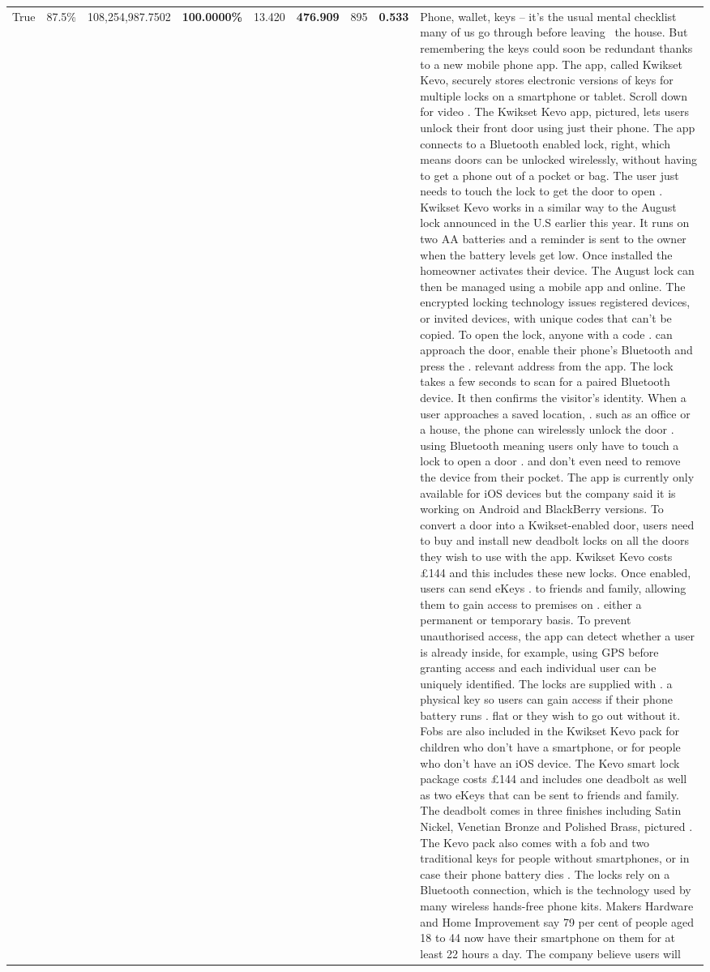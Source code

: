 \begin{table}[H]
\begin{tabular}{lllrlllll}
True & 87.5\% & 108,254,987.7502 & \bfseries \color{red} 100.0000\% & 13.420 & \bfseries \color{red} 476.909 & 895 & \bfseries \color{red} 0.533 & Phone, wallet, keys – it’s the usual mental checklist many of us go through before leaving  the house. But remembering the keys could soon be redundant thanks to a new mobile phone app. The app, called Kwikset Kevo, securely stores electronic versions of keys for multiple locks on a smartphone or tablet. Scroll down for video . The Kwikset Kevo app, pictured, lets users unlock their front door using just their phone. The app connects to a Bluetooth enabled lock, right, which means doors can be unlocked wirelessly, without having to get a phone out of a pocket or bag. The user just needs to touch the lock to get the door to open . Kwikset Kevo works in a similar way to the August lock announced in the U.S earlier this year. It runs on two AA batteries and a reminder is sent to the owner when the battery levels get low. Once installed the homeowner activates their device. The August lock can then be managed using a mobile app and online. The encrypted locking technology issues registered devices, or invited devices, with unique codes that can't be copied. To open the lock, anyone with a code . can approach the door, enable their phone's Bluetooth and press the . relevant address from the app. The lock takes a few seconds to scan for a paired Bluetooth device. It then confirms the visitor's identity. When a user approaches a saved location, . such as an office or a house, the phone can wirelessly unlock the door . using Bluetooth meaning users only have to touch a lock to open a door . and don't even need to remove the device from their pocket. The app is currently only available for iOS devices but the company said it is working on Android and BlackBerry versions. To convert a door into a Kwikset-enabled door, users need to buy and install new deadbolt locks on all the doors they wish to use with the app. Kwikset Kevo costs £144 and this includes these new locks. Once enabled, users can send eKeys . to friends and family, allowing them to gain access to premises on . either a permanent or temporary basis. To prevent unauthorised access, the app can detect whether a user is already inside, for example, using GPS before granting access and each individual user can be uniquely identified. The locks are supplied with . a physical key so users can gain access if their phone battery runs . flat or they wish to go out without it. Fobs are also included in the Kwikset Kevo pack for children who don't have a smartphone, or for people who don't have an iOS device. The Kevo smart lock package costs £144 and includes one deadbolt as well as two eKeys that can be sent to friends and family. The deadbolt comes in three finishes including Satin Nickel, Venetian Bronze and Polished Brass, pictured . The Kevo pack also comes with a fob and two traditional keys for people without smartphones, or in case their phone battery dies . The locks rely on a Bluetooth connection, which is the technology used by many wireless hands-free phone kits. Makers Hardware and Home Improvement say 79 per cent of people aged 18 to 44 now have their smartphone on them for at least 22 hours a day. The company believe users will 
\end{tabular}
\end{table}
